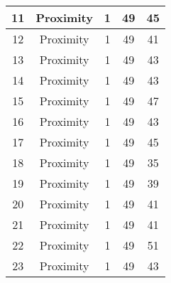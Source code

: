 \documentclass[results.tex]{subfiles}
\begin{document}
\begin{center}
\begin{tabular}{| c || c | c | c | c |}
            \hline
            11                      & Proximity                    & 1                      & 49                      & 45                   \\
            \hline
            12                      & Proximity                    & 1                      & 49                      & 41                   \\
            \hline
            13                      & Proximity                    & 1                      & 49                      & 43                   \\
            \hline
            14                      & Proximity                    & 1                      & 49                      & 43                   \\
            \hline
            15                      & Proximity                    & 1                      & 49                      & 47                   \\
            \hline
            16                      & Proximity                    & 1                      & 49                      & 43                   \\
            \hline
            17                      & Proximity                    & 1                      & 49                      & 45                   \\
            \hline
            18                      & Proximity                    & 1                      & 49                      & 35                   \\
            \hline
            19                      & Proximity                    & 1                      & 49                      & 39                   \\
            \hline
            20                      & Proximity                    & 1                      & 49                      & 41                   \\
            \hline
            21                      & Proximity                    & 1                      & 49                      & 41                   \\
            \hline
            22                      & Proximity                    & 1                      & 49                      & 51                   \\
            \hline
            23                      & Proximity                    & 1                      & 49                      & 43                   \\

\end{tabular}
\end{center}
\end{document}

